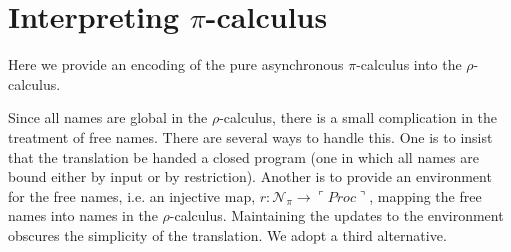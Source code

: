 \documentclass[]{amsart}
\newcommand{\lliftb}{\langle\!|}
\newcommand{\rliftb}{|\!\rangle}
\newcommand{\lpquote}{\ulcorner}
\newcommand{\rpquote}{\urcorner}
\newcommand{\nameeq}{\mathbin{\equiv_N}}
\newcommand{\lift}[2]{#1 \lliftb #2 \rliftb}
\newcommand{\quotep}[1]{\lpquote #1 \rpquote}
\newcommand{\QProc}{\quotep{\mathbin{Proc}}}
\newcommand{\parop}{\;|\;}		%
\newcommand{\wbbisim}{\stackrel{\centerdot}{\approx}} %
\newcommand{\fwbeq}{\stackrel{\circ}{\approx}}	%
\newcommand{\wbeq}{\approx}	%
\newtheorem{lem}[thm]{Lemma}
\theoremstyle{definition}
\newtheorem{defn}[thm]{Definition}
\theoremstyle{remark}
\newtheorem{rem}[thm]{Remark}
\numberwithin{equation}{subsection}
\newcommand{\pic}{$\pi$-calculus}
\newcommand{\rhoc}{$\rho$-calculus}
\begin{document}





\section{Interpreting \pic}

Here we provide an encoding of the pure asynchronous {\pic} into the {\rhoc}.


Since all names are global in the {\rhoc}, there is a small
complication in the treatment of free names. There are several ways to
handle this. One is to insist that the translation be handed a closed
program (one in which all names are bound either by input or by
restriction). Another is to provide an environment for the free names,
i.e. an injective map, $r : \mathcal{N}_{\pi} \rightarrow \QProc$,
mapping the free names into names in the {\rhoc}. Maintaining the
updates to the environment obscures the simplicity of the
translation. We adopt a third alternative.
\end{document}

